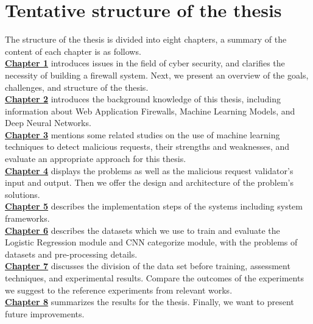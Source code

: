 \section{Tentative structure of the thesis}
\label{sec:structure}
	\newcommand\nextintro{\\[4mm]}
	\hspace{0.5cm}The structure of the thesis is divided into eight chapters, a summary of the content of each chapter is as follows. \nextintro
	\hyperref[chap:introduction]{\textbf{Chapter 1}} introduces issues in the field of cyber security, and clarifies the necessity of building a firewall system. Next, we present an overview of the goals, challenges, and structure of the thesis.\nextintro
	\hyperref[chap:background]{\textbf{Chapter 2}} introduces the background knowledge of this thesis, including information about Web Application Firewalls, Machine Learning Models, and Deep Neural Networks.\nextintro
	\hyperref[chap:literaturereview]{\textbf{Chapter 3}} mentions some related studies on the use of machine learning techniques to detect malicious requests, their strengths and weaknesses, and evaluate an appropriate approach for this thesis.\nextintro
	\hyperref[chap:proposed_approaches]{\textbf{Chapter 4}} displays the problems as well as the malicious request validator's input and output. Then we offer the design and architecture of the problem's solutions.\nextintro
	\hyperref[chap:implementation]{\textbf{Chapter 5}} describes the implementation steps of the systems including system frameworks.\nextintro
	\hyperref[chap:dataset]{\textbf{Chapter 6}} describes the datasets which we use to train and evaluate the Logistic Regression module and CNN categorize module, with the problems of datasets and pre-processing details.\nextintro 
	\hyperref[chap:experiments]{\textbf{Chapter 7}} discusses the division of the data set before training, assessment techniques, and experimental results. Compare the outcomes of the experiments we suggest to the reference experiments from relevant works.\nextintro
	\hyperref[chap:conclusion]{\textbf{Chapter 8}} summarizes the results for the thesis. Finally, we want to present future improvements.\nextintro
